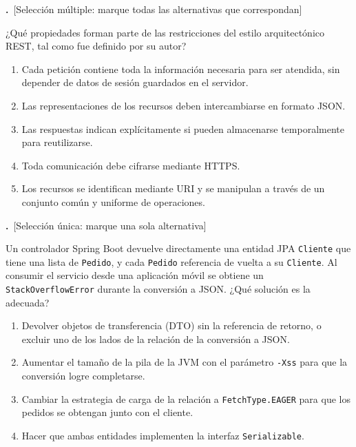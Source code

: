 \documentclass[11pt,a4paper]{article}
\newif\ifclave
\newcounter{preg}
\newcommand{\tipounica}{\textcolor{uteqMid}{\small\textsf{[Selección única: marque una sola alternativa]}}}
\newcommand{\tipomultiple}{\textcolor{uteqAmber!80!black}{\small\textsf{[Selección múltiple: marque todas las alternativas que correspondan]}}}
\newcommand{\pregunta}[2]{%
	\refstepcounter{preg}%
	\par\medskip
	\noindent\textbf{\color{uteqBlue}\arabic{preg}.}~#1\par
	\noindent #2\par\nopagebreak
}
\newcommand{\ok}{\ifclave~\textcolor{uteqGreen}{\ding{51}~\textbf{Correcta}}\fi}
\newenvironment{opciones}{%
	\begin{enumerate}[label={$\square$\ \alph*)},leftmargin=2.6em,itemsep=1pt,topsep=2pt]
}{%
	\end{enumerate}
}
\newcommand{\just}[1]{%
	\ifclave
		\begin{tcolorbox}[colback=uteqGreen!6,colframe=uteqGreen!70!black,boxrule=0.4pt,arc=1mm,left=4pt,right=4pt,top=2pt,bottom=2pt,fontupper=\small]
			\textbf{Justificación:} #1
		\end{tcolorbox}
	\fi
}
\begin{document}
\pregunta{\tipomultiple}{¿Qué propiedades forman parte de las restricciones del estilo arquitectónico REST, tal como fue definido por su autor?}
\begin{opciones}
	\item Cada petición contiene toda la información necesaria para ser atendida, sin depender de datos de sesión guardados en el servidor.\ok
	\item Las representaciones de los recursos deben intercambiarse en formato JSON.
	\item Las respuestas indican explícitamente si pueden almacenarse temporalmente para reutilizarse.\ok
	\item Toda comunicación debe cifrarse mediante HTTPS.
	\item Los recursos se identifican mediante URI y se manipulan a través de un conjunto común y uniforme de operaciones.\ok
\end{opciones}
\just{Fielding define REST mediante cliente-servidor, ausencia de estado de sesión en el servidor, caché, interfaz uniforme, sistema en capas y código bajo demanda \cite{fielding2000rest}. REST no impone JSON (admite cualquier representación) ni HTTPS, aunque este último sea una buena práctica de seguridad.}

\pregunta{\tipounica}{Un controlador Spring Boot devuelve directamente una entidad JPA \texttt{Cliente} que tiene una lista de \texttt{Pedido}, y cada \texttt{Pedido} referencia de vuelta a su \texttt{Cliente}. Al consumir el servicio desde una aplicación móvil se obtiene un \texttt{StackOverflowError} durante la conversión a JSON. ¿Qué solución es la adecuada?}
\begin{opciones}
	\item Devolver objetos de transferencia (DTO) sin la referencia de retorno, o excluir uno de los lados de la relación de la conversión a JSON.\ok
	\item Aumentar el tamaño de la pila de la JVM con el parámetro \texttt{-Xss} para que la conversión logre completarse.
	\item Cambiar la estrategia de carga de la relación a \texttt{FetchType.EAGER} para que los pedidos se obtengan junto con el cliente.
	\item Hacer que ambas entidades implementen la interfaz \texttt{Serializable}.
\end{opciones}
\just{La relación bidireccional provoca una recursión infinita (cliente, pedidos, cliente\ldots) al convertir a JSON. Se corta usando DTO o anotaciones como \texttt{@JsonIgnore} o \texttt{@JsonManagedReference}/\texttt{@JsonBackReference}. Una pila mayor solo retrasa el error, la carga ansiosa no elimina el ciclo y \texttt{Serializable} se refiere a la serialización binaria de Java, no a JSON.}
\end{document}
